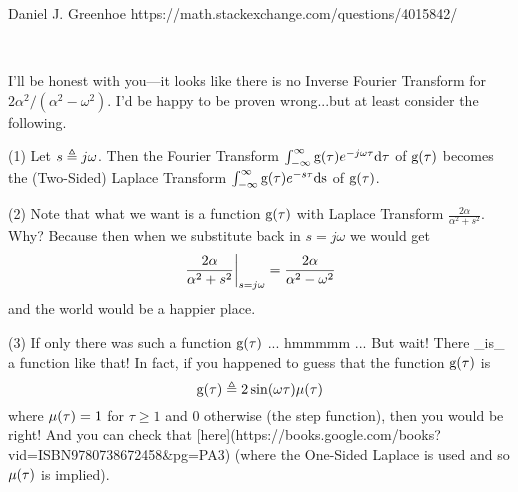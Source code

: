 Daniel J. Greenhoe
https://math.stackexchange.com/questions/4015842/


$\newcommand{\eqd}{\triangleq}$
$\newcommand{\eqa}{\approx}$
$\newcommand{\abs}[1]{{\left\lvert #1 \right\rvert}}$
$\newcommand{\brp}[1]{{\left(#1\right)}}$
$\newcommand{\brs}[1]{{\left[#1\right]}}$
$\newcommand{\brlr}[1]{\left.#1\right|}$
$\newcommand{\deriv} [2]   {{\frac{\mathrm{d}#1}{\mathrm{d}#2} }}$
$\newcommand{\R}{\Bbb{R}}$
$\newcommand{\intcc} [2]  {{\left[#1:#2\right]}}$
$\newcommand{\intoo} [2]  {{\left(#1:#2\right)}}$
$\newcommand{\intoc} [2]  {{\left(#1:#2\right]}}$
$\newcommand{\intco} [2]  {{\left[#1:#2\right)}}$
$\newcommand{\ff}{\mathrm{f}}$
$\newcommand{\fF}{\mathrm{F}}$
$\newcommand{\fG}{\mathrm{G}}$
$\newcommand{\fg}{\mathrm{g}}$
$\newcommand{\fphi}{\mathrm{\phi}}$
$\newcommand{\dx}{\mathrm{dx}}$
$\newcommand{\dS}{\mathrm{ds}}$
$\newcommand{\dtau}{\mathrm{d\tau}}$
$\newcommand{\du}{\mathrm{du}}$
$\newcommand{\dv}{\mathrm{dv}}$
$\newcommand{\step}{\mu}$
$\newcommand{\ds}{\displaystyle}$
$\newcommand{\thme}[1]{#1}$
$\newcommand{\opFT}{\mathrm{F}}$
$\newcommand{\opFT}{\mathrm{L}}$
$\newcommand{\opIFT}{\mathrm{IFT}}$
$\newcommand{\thme}[1]{#1}$
$\newcommand{\Real}{\mathrm{Re}}$


I'll be honest with you---it looks like there is no Inverse Fourier Transform for $2\alpha^2/(\alpha^2-\omega^2)$. 
I'd be happy to be proven wrong...but at least consider the following.

(1) Let $s\eqd j\omega$. Then the Fourier Transform $\int_{-\infty}^{\infty} \fg(\tau)e^{-j\omega\tau}\dtau$ of $\fg(\tau)$
becomes the (Two-Sided) Laplace Transform $\int_{-\infty}^{\infty} \fg(\tau)e^{-s\tau}\dS$ of $\fg(\tau)$.

(2) Note that what we want is a function $\fg(\tau)$ with Laplace Transform $\frac{2\alpha}{\alpha^2+s^2}$. Why?
Because then when we substitute back in $s=j\omega$ we would get 
$$\brlr{\frac{2\alpha}{\alpha^2+s^2}}_{s=j\omega} = \frac{2\alpha}{\alpha^2-\omega^2}$$
and the world would be a happier place.

(3) If only there was such a function $\fg(\tau)$ ... hmmmmm ... But wait! There _is_ a function like that! In fact, if you happened to guess that the function $\fg(\tau)$ is
$$\fg(\tau)\eqd 2\sin(\omega\tau)\step(\tau)$$
where $\step(\tau)=1$ for $\tau\geq1$ and $0$ otherwise (the step function), then you would be right! And you can check that [here](https://books.google.com/books?vid=ISBN9780738672458&pg=PA3) (where the One-Sided Laplace is used and so $\step(\tau)$ is implied).

